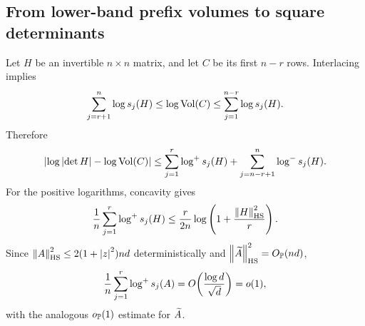 \subsection{From lower-band prefix volumes to square determinants}

Let $H$ be an invertible $n\times n$ matrix, and let $C$ be its first $n-r$ rows. Interlacing implies
\[
  \sum_{j=r+1}^n\log s_j(H)
  \le\log\operatorname{Vol}(C)
  \le\sum_{j=1}^{n-r}\log s_j(H).
\]
Therefore
\begin{equation}\label{eq:prefix-square-error}
  \left|\log\left|\det H\right|-\log\operatorname{Vol}(C)\right|
  \le\sum_{j=1}^r\log^{+} s_j(H)
  +\sum_{j=n-r+1}^n\log^{-} s_j(H).
\end{equation}
For the positive logarithms, concavity gives
\begin{equation}\label{eq:positive-prefix-tail}
  \frac1n\sum_{j=1}^r\log^{+} s_j(H)
  \le\frac r{2n}\log\left(1+\frac{\left\|H\right\|_{\mathrm{HS}}^2}{r}\right).
\end{equation}
Since $\left\|A\right\|_{\mathrm{HS}}^2\le2(1+\left|z\right|^2)nd$ deterministically and
$\left\|\widetilde A\right\|_{\mathrm{HS}}^2=O_{\mathbb P}(nd)$,
\begin{equation}\label{eq:lower-positive-tail}
  \frac1n\sum_{j=1}^r\log^{+} s_j(A)
  =O\!\left(\frac{\log d}{\sqrt d}\right)=o(1),
\end{equation}
with the analogous $o_{\mathbb P}(1)$ estimate for $\widetilde A$.

